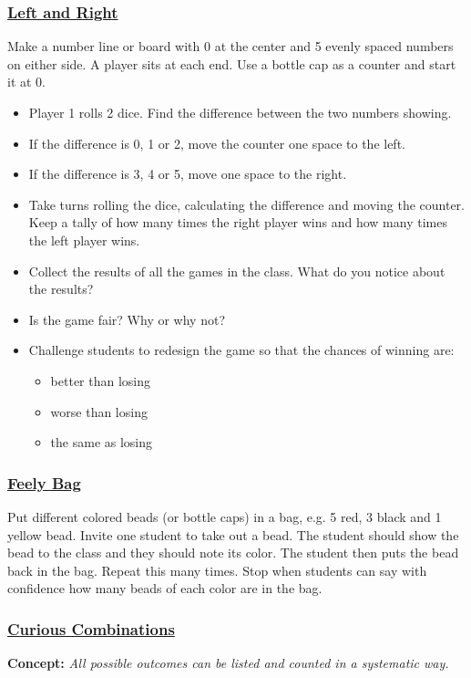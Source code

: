 		\subsubsection{\underline{Left and Right}}
	Make a number line or board with 0 at the center and 5 evenly spaced numbers on either side. A player sits at each end. Use a bottle cap as a counter and start it at 0.
	\begin{itemize}
	\item Player 1 rolls 2 dice. Find the difference between the two numbers showing.
	\item If the difference is 0, 1 or 2, move the counter one space to the left.
	\item If the difference is 3, 4 or 5, move one space to the right.
	\item Take turns rolling the dice, calculating the difference and moving the counter. Keep a tally of how many times the right player wins and how many times the left player wins.
	\item Collect the results of all the games in the class. What do you notice about the results?
	\item Is the game fair? Why or why not?
	\item Challenge students to redesign the game so that the chances of winning are:
	\begin{itemize}
	\item better than losing
	\item worse than losing
	\item the same as losing
	\end{itemize}
\end{itemize}	
	
		\subsubsection{\underline{Feely Bag}}
	Put different colored beads (or bottle caps) in a bag, e.g. 5 red, 3 black and 1 yellow bead. Invite one student to take out a bead. The student should show the bead to the class and they should note its color. The student then puts the bead back in the bag. Repeat this many times. Stop when students can say with confidence how many beads of each color are in the bag.
	
		\subsubsection{\underline{Curious Combinations}}
	\textbf{Concept:} \emph{All possible outcomes can be listed and counted in a systematic way.}\\
	
